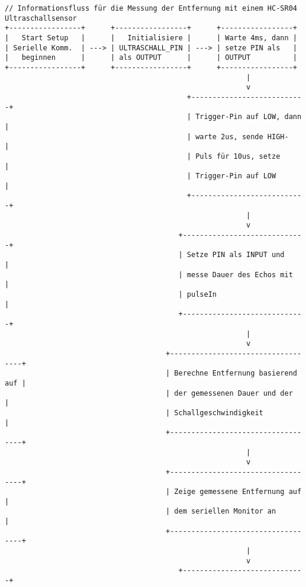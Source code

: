 \documentclass{vorlage-design-main}
\begin{document}
\begin{lstlisting}
// Informationsfluss für die Messung der Entfernung mit einem HC-SR04 Ultraschallsensor
+-----------------+      +-----------------+      +-----------------+
|   Start Setup   |      |   Initialisiere |      | Warte 4ms, dann |
| Serielle Komm.  | ---> | ULTRASCHALL_PIN | ---> | setze PIN als   |
|   beginnen      |      | als OUTPUT      |      | OUTPUT          |
+-----------------+      +-----------------+      +-----------------+
                                                         |
                                                         v
                                           +---------------------------+
                                           | Trigger-Pin auf LOW, dann |
                                           | warte 2us, sende HIGH-    |
                                           | Puls für 10us, setze      |
                                           | Trigger-Pin auf LOW       |
                                           +---------------------------+
                                                         |
                                                         v
                                         +-----------------------------+
                                         | Setze PIN als INPUT und     |
                                         | messe Dauer des Echos mit   |
                                         | pulseIn                     |
                                         +-----------------------------+
                                                         |
                                                         v
                                      +-----------------------------------+
                                      | Berechne Entfernung basierend auf |
                                      | der gemessenen Dauer und der      |
                                      | Schallgeschwindigkeit             |
                                      +-----------------------------------+
                                                         |
                                                         v
                                      +-----------------------------------+
                                      | Zeige gemessene Entfernung auf    |
                                      | dem seriellen Monitor an          |
                                      +-----------------------------------+
                                                         |
                                                         v
                                         +-----------------------------+

\end{lstlisting}
\end{document}
